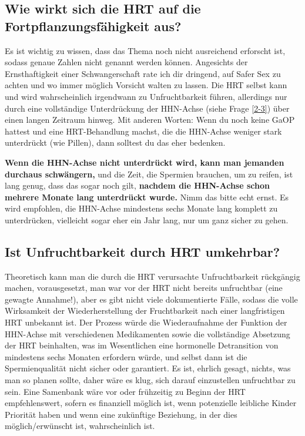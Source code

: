 \documentclass{article}
\begin{document}
{{{\subsection{Wie wirkt sich die HRT auf die Fortpflanzungsfähigkeit aus?}\label{11-42}

Es ist wichtig zu wissen, dass das Thema noch nicht ausreichend erforscht ist, sodass genaue Zahlen nicht genannt werden können. Angesichts der Ernsthaftigkeit einer Schwangerschaft rate ich dir dringend, auf Safer Sex zu achten und wo immer möglich Vorsicht walten zu lassen. Die HRT selbst kann und wird wahrscheinlich irgendwann zu Unfruchtbarkeit führen, allerdings nur durch eine vollständige Unterdrückung der HHN-Achse (siehe Frage \ref{2-3}) über einen langen Zeitraum hinweg. Mit anderen Worten: Wenn du noch keine GaOP hattest und eine HRT-Behandlung machst, die die HHN-Achse weniger stark unterdrückt (wie Pillen), dann solltest du das eher bedenken.

\textbf{Wenn die HHN-Achse nicht unterdrückt wird, kann man jemanden durchaus schwängern,} und die Zeit, die Spermien brauchen, um zu reifen, ist lang genug, dass das sogar noch gilt, \textbf{nachdem die HHN-Achse schon mehrere Monate lang unterdrückt wurde.} Nimm das bitte echt ernst. Es wird empfohlen, die HHN-Achse mindestens sechs Monate lang komplett zu unterdrücken, vielleicht sogar eher ein Jahr lang, nur um ganz sicher zu gehen.  

\subsection{Ist Unfruchtbarkeit durch HRT umkehrbar?}\label{11-43}

Theoretisch kann man die durch die HRT verursachte Unfruchtbarkeit rückgängig machen, vorausgesetzt, man war vor der HRT nicht bereits unfruchtbar (eine gewagte Annahme!), aber es gibt nicht viele dokumentierte Fälle, sodass die volle Wirksamkeit der Wiederherstellung der Fruchtbarkeit nach einer langfristigen HRT unbekannt ist. Der Prozess würde die Wiederaufnahme der Funktion der HHN-Achse mit verschiedenen Medikamenten sowie die vollständige Absetzung der HRT beinhalten, was im Wesentlichen eine hormonelle Detransition von mindestens sechs Monaten erfordern würde, und selbst dann ist die Spermienqualität nicht sicher oder garantiert. Es ist, ehrlich gesagt, nichts, was man so planen sollte, daher wäre es klug, sich darauf einzustellen unfruchtbar zu sein. Eine Samenbank wäre vor oder frühzeitig zu Beginn der HRT empfehlenswert, sofern es finanziell möglich ist, wenn potenzielle leibliche Kinder Priorität haben und wenn eine zukünftige Beziehung, in der dies möglich/erwünscht ist, wahrscheinlich ist.

}}}
\end{document}
